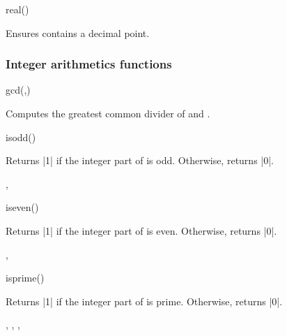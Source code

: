 \begin{math-function}{real()}
\mathcommand

	Ensures  contains a decimal point.

\begin{codeexample}[]
 \pgfmathresult
\end{codeexample}

\end{math-function}


\subsubsection{Integer arithmetics functions}

\label{pgfmath-functions-integerarithmetics}

\begin{math-function}{gcd(,)}
\mathcommand

  Computes the greatest common divider of  and . 

\begin{codeexample}[]
 \pgfmathresult
\end{codeexample}

\end{math-function}

\begin{math-function}{isodd()}
\mathcommand

  Returns |1| if the integer part of  is odd. Otherwise, returns |0|.

\begin{codeexample}[]
 \pgfmathresult, 
 \pgfmathresult
\end{codeexample}

\end{math-function}

\begin{math-function}{iseven()}
\mathcommand

  Returns |1| if the integer part of  is even. Otherwise, returns |0|.

\begin{codeexample}[]
 \pgfmathresult, 
 \pgfmathresult
\end{codeexample}

\end{math-function}

\begin{math-function}{isprime()}
\mathcommand

  Returns |1| if the integer part of  is prime. Otherwise, returns |0|.

\begin{codeexample}[]
 \pgfmathresult, 
 \pgfmathresult,
 \pgfmathresult,
 \pgfmathresult
\end{codeexample}

\end{math-function}


